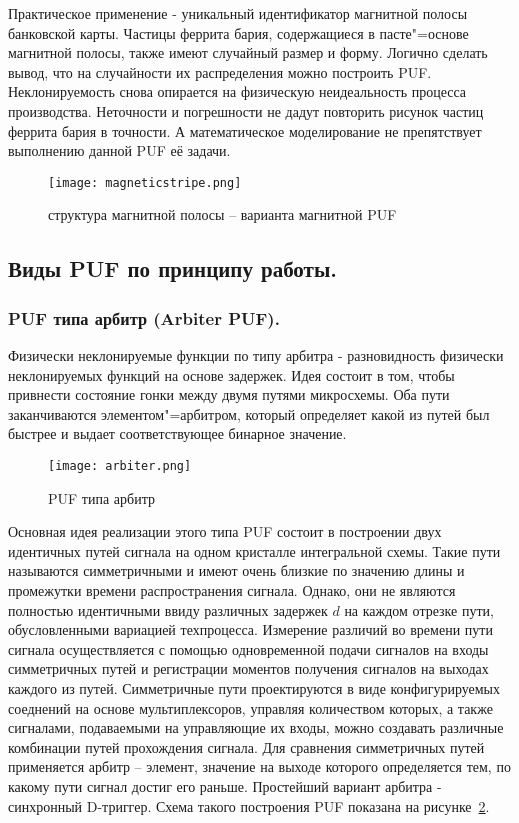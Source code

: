 Практическое применение - уникальный идентификатор магнитной полосы банковской карты. Частицы феррита бария, содержащиеся в пасте"=основе магнитной полосы, также имеют случайный размер и форму. Логично сделать вывод, что на случайности их распределения можно построить PUF. Неклонируемость снова опирается на физическую неидеальность процесса производства. Неточности и погрешности не дадут повторить рисунок частиц феррита бария в  точности. А математическое моделирование не препятствует выполнению данной PUF её задачи.
\begin{figure}[ht]
    \centering
    \label{fig:domain:puf_physical_types:magnetic}
    \texttt{[image: magneticstripe.png]}
    \caption{структура магнитной полосы -- варианта магнитной PUF}
\end{figure}

\subsection{Виды PUF по принципу работы. }
\label{sub:domain:puf_types}


\subsubsection{PUF типа арбитр (Arbiter PUF). }
\label{sub:domain:puf_types:arbiter}

Физически неклонируемые функции по типу арбитра - разновидность физически неклонируемых функций на основе задержек. Идея состоит в том, чтобы привнести состояние гонки между двумя путями микросхемы. Оба пути заканчиваются элементом"=арбитром, который определяет какой из путей был быстрее и выдает соответствующее бинарное значение.
\begin{figure}[ht]
    \centering
    \texttt{[image: arbiter.png]}
    \caption{PUF типа арбитр}
    \label{fig:domain:puf_types:arbiter}
\end{figure}

Основная идея реализации этого типа PUF состоит в построении двух идентичных путей сигнала на одном кристалле интегральной схемы. Такие пути называются симметричными и имеют очень близкие по значению длины и промежутки времени распространения сигнала. Однако, они не являются полностью идентичными ввиду различных задержек $d$ на каждом отрезке пути, обусловленными вариацией техпроцесса. Измерение различий во времени пути сигнала осуществляется с помощью одновременной подачи сигналов на входы симметричных путей и регистрации моментов получения сигналов на выходах каждого из путей. Симметричные пути проектируются в виде конфигурируемых соеднений на основе мультиплексоров, управляя количеством которых, а также сигналами, подаваемыми на управляющие их входы, можно создавать различные комбинации путей прохождения сигнала. Для сравнения симметричных путей применяется арбитр -- элемент, значение на выходе которого определяется тем, по какому пути сигнал достиг его раньше. Простейший вариант арбитра - синхронный D-триггер. Схема такого построения PUF показана на рисунке~\ref{fig:domain:puf_types:arbiter}.

